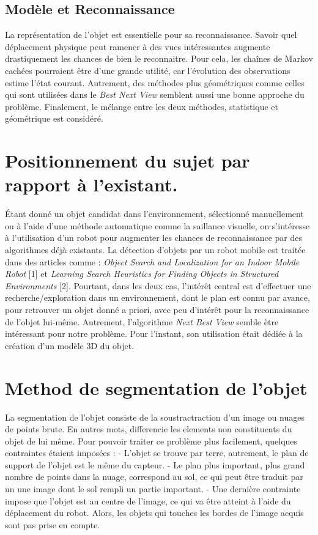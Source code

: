 \subsection{Modèle et Reconnaissance}
La représentation de l’objet est essentielle pour sa reconnaissance. Savoir quel déplacement physique peut ramener à des vues intéressantes augmente drastiquement les chances de bien le reconnaitre. Pour cela, les chaînes de Markov cachées pourraient être d'une grande utilité, car l'évolution des observations estime l'état courant. Autrement, des méthodes plus géométriques comme celles qui sont utilisées dans le \textit{Best Next View} semblent aussi une bonne approche du problème. Finalement, le mélange entre les deux méthodes, statistique et géométrique est considéré.


\section{Positionnement du sujet par rapport à l’existant.}
Étant donné un objet candidat dans l'environnement, sélectionné manuellement ou à l'aide d’une méthode automatique comme la saillance visuelle, on s'intéresse à l'utilisation d'un robot pour augmenter les chances de reconnaissance par des algorithmes déjà existants. La détection d'objets par un robot mobile est traitée dans des articles comme : \textit{Object Search and Localization for an Indoor Mobile Robot} [1] et \textit{Learning Search Heuristics for Finding Objects in Structured Environments} [2]. Pourtant, dans les deux cas, l'intérêt central est d'effectuer une recherche/exploration dans un environnement, dont le plan est connu par avance, pour retrouver un objet donné a priori, avec peu d'intérêt pour la reconnaissance de l'objet lui-même.  Autrement, l'algorithme \textit{Next Best View} semble être intéressant pour notre problème. Pour l'instant, son utilisation était dédiée à la création d'un modèle 3D du objet.


\section{Method de segmentation de l'objet}

La segmentation de l'objet consiste de la soustractraction d'un image ou nuages de points brute. En autres mots, differencie les elements non constituents du objet de lui même. Pour pouvoir traiter ce problème plus facilement, quelques contraintes étaient imposées :
- L'objet se trouve par terre, autrement, le plan de support de l'objet est le même du capteur.
- Le plan plus important, plus grand nombre de points dans la nuage, correspond au sol, ce qui peut être traduit par un une image dont le sol rempli un partie important.
- Une dernière contrainte impose que l'objet est au centre de l'image, ce qui va être atteint à l'aide du déplacement du robot. Alors, les objets qui touches les bordes de l'image acquis sont pas prise en compte.

